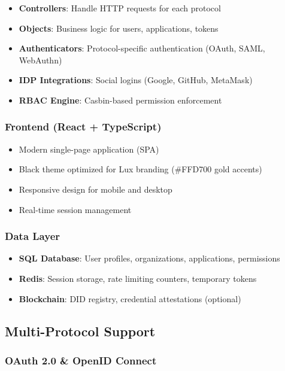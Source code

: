 \documentclass[11pt,a4paper]{article}
\begin{document}
\begin{itemize}
  \item \textbf{Controllers}: Handle HTTP requests for each protocol
  \item \textbf{Objects}: Business logic for users, applications, tokens
  \item \textbf{Authenticators}: Protocol-specific authentication (OAuth, SAML, WebAuthn)
  \item \textbf{IDP Integrations}: Social logins (Google, GitHub, MetaMask)
  \item \textbf{RBAC Engine}: Casbin-based permission enforcement
\end{itemize}

\subsubsection{Frontend (React + TypeScript)}

\begin{itemize}
  \item Modern single-page application (SPA)
  \item Black theme optimized for Lux branding (\#FFD700 gold accents)
  \item Responsive design for mobile and desktop
  \item Real-time session management
\end{itemize}

\subsubsection{Data Layer}

\begin{itemize}
  \item \textbf{SQL Database}: User profiles, organizations, applications, permissions
  \item \textbf{Redis}: Session storage, rate limiting counters, temporary tokens
  \item \textbf{Blockchain}: DID registry, credential attestations (optional)
\end{itemize}

\subsection{Multi-Protocol Support}

\subsubsection{OAuth 2.0 \& OpenID Connect}
\end{document}

